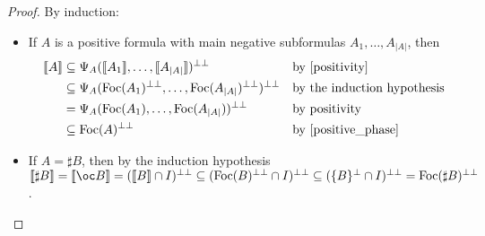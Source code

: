 \documentclass[11pt]{article}
\newcommand\size[1]{{\lvert #1 \rvert}}
\newcommand\sem[1]{{\llbracket #1 \rrbracket}}
\newcommand\biperp{{\perp\perp}}
\newcommand\Foc{\textup{Foc}}
\begin{document}
\begin{proof}
    By induction:
    \begin{itemize}
        \item If $A$ is a positive formula with main negative subformulas $A_1, \dots, A_\size{A}$, then \begin{align*}
            \sem{A}
            &\subseteq \Psi_A(\sem{A_1}, \dots, \sem{A_\size{A}})^\biperp &&\text{by \cref{positivity}} \\
            &\subseteq \Psi_A(\Foc(A_1)^\biperp, \dots, \Foc(A_\size{A})^\biperp)^\biperp &&\text{by the induction hypothesis} \\
            &= \Psi_A(\Foc(A_1), \dots, \Foc(A_\size{A}))^\biperp &&\text{by positivity} \\
            &\subseteq \Foc(A)^\biperp &&\text{by \cref{positive_phase}}
        \end{align*}
        \item If $A = \sharp B$, then by the induction hypothesis
        $\sem{\sharp B} = \sem{\oc B} = (\sem{B} \cap I)^\biperp \subseteq (\Foc(B)^\biperp \cap I)^\biperp \subseteq (\{B\}^\perp \cap I)^\biperp = \Foc(\sharp B)^\biperp$.


\end{itemize}
\end{proof}
\end{document}
